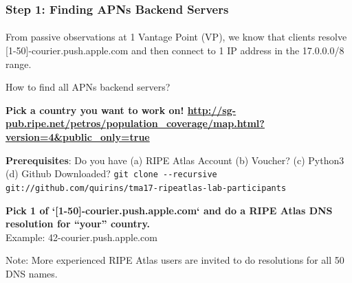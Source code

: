 
\begin{frame}
\frametitle{Step 1: Finding APNs Backend Servers}
\framesubtitle{}

From passive observations at 1 Vantage Point (VP), we know that clients resolve [1-50]-courier.push.apple.com and then connect to 1 IP address in the 17.0.0.0/8 range.

How to find all APNs backend servers?
\pause

\textbf{Pick a country you want to work on! \url{http://sg-pub.ripe.net/petros/population_coverage/map.html?version=4&public_only=true}}
\pause

\textbf{Prerequisites}: Do you have (a) RIPE Atlas Account (b) Voucher? (c) Python3 (d) Github Downloaded?
\texttt{git clone -{}-recursive git://github.com/quirins/tma17-ripeatlas-lab-participants}

\pause

\textbf{Pick 1 of `[1-50]-courier.push.apple.com` and do a RIPE Atlas DNS resolution for ``your'' country.}\\
Example: 42-courier.push.apple.com

Note: More experienced RIPE Atlas users are invited to do resolutions for all 50 DNS names.

\end{frame}
\clearpage
%
%
